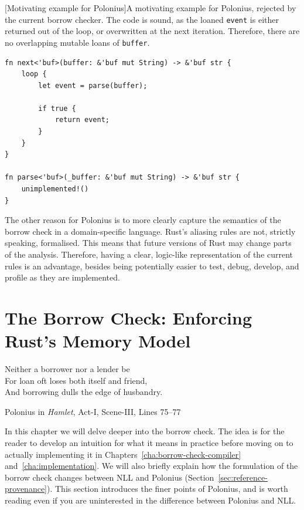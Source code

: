 \documentclass[11pt,a4paper,twoside,openany,draft]{report}
\newenvironment{sourcecode}{\captionsetup{type=listing}}{}
\newcommand{\InRust}[1]{\texttt{#1}}
\begin{document}
\begin{sourcecode}
  [Motivating example for Polonius]{A motivating example for
    Polonius, rejected by the current borrow checker. The code is sound, as the
    loaned \InRust{event} is either returned out of the loop, or overwritten at
    the next iteration. Therefore, there are no overlapping mutable loans of
    \InRust{buffer}.~\cite{issue-51132}}\label{lst:motivating-example}
\begin{verbatim}
fn next<'buf>(buffer: &'buf mut String) -> &'buf str {
    loop {
        let event = parse(buffer);

        if true {
            return event;
        }
    }
}

fn parse<'buf>(_buffer: &'buf mut String) -> &'buf str {
    unimplemented!()
}
\end{verbatim}
\end{sourcecode}

The other reason for Polonius is to more clearly capture the semantics of the
borrow check in a domain-specific language. Rust's aliasing rules are not,
strictly speaking, formalised. This means that future versions of Rust may
change parts of the analysis. Therefore, having a clear, logic-like
representation of the current rules is an advantage, besides being potentially
easier to test, debug, develop, and profile as they are implemented.

\chapter{The Borrow Check: Enforcing Rust's Memory
  Model}\label{cha:borrowing-rules}

\epigraph{Neither a borrower nor a lender be\\
  For loan oft loses both itself and friend,\\
  And borrowing dulls the edge of husbandry.}%
{Polonius in \textit{Hamlet}, Act-I, Scene-III, Lines 75--77}

In this chapter we will delve deeper into the borrow check. The idea is for the
reader to develop an intuition for what it means in practice before moving on to
actually implementing it in Chapters~\ref{cha:borrow-check-compiler}
and~\ref{cha:implementation}. We will also briefly explain how the formulation
of the borrow check changes between NLL and Polonius
(Section~\ref{sec:reference-provenance}). This section introduces the finer
points of Polonius, and is worth reading even if you are uninterested in the
difference between Polonius and NLL\@.
\end{document}
